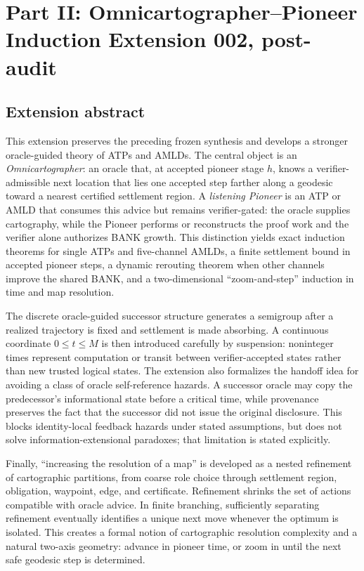 \documentclass[11pt]{article}
\theoremstyle{remark}
\begin{document}
\newpage
\section*{Part II: Omnicartographer--Pioneer Induction Extension 002, post-audit}
\subsection*{Extension abstract}
This extension preserves the preceding frozen synthesis and develops a stronger oracle-guided theory of ATPs and AMLDs. The central object is an \emph{Omnicartographer}: an oracle that, at accepted pioneer stage $h$, knows a verifier-admissible next location that lies one accepted step farther along a geodesic toward a nearest certified settlement region. A \emph{listening Pioneer} is an ATP or AMLD that consumes this advice but remains verifier-gated: the oracle supplies cartography, while the Pioneer performs or reconstructs the proof work and the verifier alone authorizes BANK growth. This distinction yields exact induction theorems for single ATPs and five-channel AMLDs, a finite settlement bound in accepted pioneer steps, a dynamic rerouting theorem when other channels improve the shared BANK, and a two-dimensional ``zoom-and-step'' induction in time and map resolution.

The discrete oracle-guided successor structure generates a semigroup after a realized trajectory is fixed and settlement is made absorbing. A continuous coordinate $0\le t\le M$ is then introduced carefully by suspension: noninteger times represent computation or transit between verifier-accepted states rather than new trusted logical states. The extension also formalizes the handoff idea for avoiding a class of oracle self-reference hazards. A successor oracle may copy the predecessor's informational state before a critical time, while provenance preserves the fact that the successor did not issue the original disclosure. This blocks identity-local feedback hazards under stated assumptions, but does not solve information-extensional paradoxes; that limitation is stated explicitly.

Finally, ``increasing the resolution of a map'' is developed as a nested refinement of cartographic partitions, from coarse role choice through settlement region, obligation, waypoint, edge, and certificate. Refinement shrinks the set of actions compatible with oracle advice. In finite branching, sufficiently separating refinement eventually identifies a unique next move whenever the optimum is isolated. This creates a formal notion of cartographic resolution complexity and a natural two-axis geometry: advance in pioneer time, or zoom in until the next safe geodesic step is determined.
\end{document}
